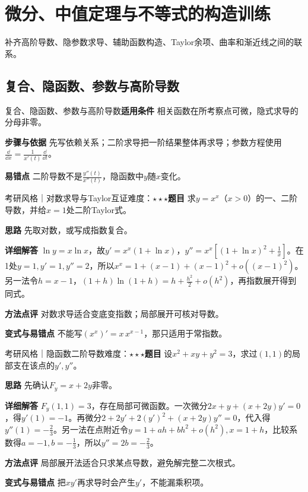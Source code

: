 \section{微分、中值定理与不等式的构造训练}\label{deep:differential_source_deep}

\begin{examtip}补齐高阶导数、隐参数求导、辅助函数构造、Taylor余项、曲率和渐近线之间的联系。\end{examtip}

\subsection{复合、隐函数、参数与高阶导数}\label{deep:differential_source_deep:derivatives}

\begin{method}{复合、隐函数、参数与高阶导数}\textbf{适用条件} 相关函数在所考察点可微，隐式求导的分母非零。\par\textbf{步骤与依据} 先写依赖关系；二阶求导把一阶结果整体再求导；参数方程使用$\frac{\dd}{\dd x}=\frac{1}{x'(t)}\frac{\dd}{\dd t}$。\par\textbf{易错点} 二阶导数不是$\frac{y''(t)}{x''(t)}$，隐函数中$y$随$x$变化。\end{method}

\begin{example}{考研风格｜对数求导与Taylor互证}{难度：$\star\star\star$}\label{deep:ex:differential_source_deep:logdiff}\textbf{题目} 求$y=x^x$（$x>0$）的一、二阶导数，并给$x=1$处二阶Taylor式。\par\textbf{思路} 先取对数，或写成指数复合。\par\textbf{详细解答} $\ln y=x\ln x$，故$y'=x^x(1+\ln x)$，$y''=x^x[(1+\ln x)^2+\frac{1}{x}]$。在1处$y=1,y'=1,y''=2$，所以$x^x=1+(x-1)+(x-1)^2+o((x-1)^2)$。另一法令$h=x-1$，$(1+h)\ln(1+h)=h+\frac{h^2}{2}+o(h^2)$，再指数展开得到同式。\par\textbf{方法点评} 对数求导适合变底变指数；局部展开可核对导数。\par\textbf{变式与易错点} 不能写$(x^x)'=x\,x^{x-1}$，那只适用于常指数。\end{example}

\begin{example}{考研风格｜隐函数二阶导数}{难度：$\star\star\star$}\label{deep:ex:differential_source_deep:implicit2}\textbf{题目} 设$x^2+xy+y^2=3$，求过$(1,1)$的局部支在该点的$y',y''$。\par\textbf{思路} 先确认$F_y=x+2y$非零。\par\textbf{详细解答} $F_y(1,1)=3$，存在局部可微函数。一次微分$2x+y+(x+2y)y'=0$，得$y'(1)=-1$。再微分$2+2y'+2(y')^2+(x+2y)y''=0$，代入得$y''(1)=-\frac{2}{3}$。另一法在点附近令$y=1+ah+bh^2+o(h^2),x=1+h$，比较系数得$a=-1,b=-\frac{1}{3}$，所以$y''=2b=-\frac{2}{3}$。\par\textbf{方法点评} 局部展开法适合只求某点导数，避免解完整二次根式。\par\textbf{变式与易错点} 把$xy'$再求导时会产生$y'$，不能漏乘积项。\end{example}

